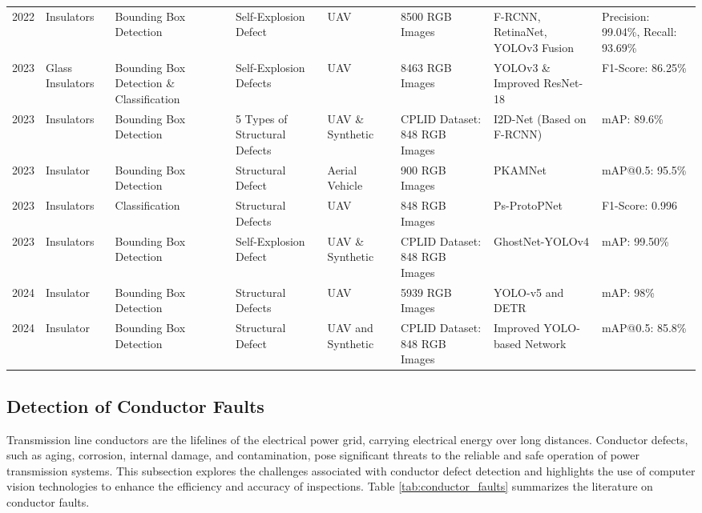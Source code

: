 {\begin{longtable}{P{.05} P{.1} P{.1} P{.1} P{.1} P{.15} P{.1} P{.1}}
2022 \cite{wei_online_2022} & Insulators & Bounding Box Detection & Self-Explosion Defect & UAV & 8500 RGB Images & F-RCNN, RetinaNet, YOLOv3 Fusion & Precision: 99.04\%, Recall: 93.69\% \\

2023 \cite{cao_accurate_2023} & Glass Insulators & Bounding Box Detection \& Classification & Self-Explosion Defects & UAV & 8463 RGB Images & YOLOv3 \& Improved ResNet-18 & F1-Score: 86.25\% \\

2023 \cite{fu_small_sized_2023} & Insulators & Bounding Box Detection & 5 Types of Structural Defects & UAV \& Synthetic & CPLID Dataset: 848 RGB Images & I2D-Net (Based on F-RCNN) & mAP: 89.6\% \\

2023 \cite{hao2023pkamnet} & Insulator & Bounding Box Detection & Structural Defect & Aerial Vehicle & 900 RGB Images & PKAMNet & mAP@0.5: 95.5\% \\

2023 \cite{singh_2023_interpretable} & Insulators & Classification & Structural Defects & UAV & 848 RGB Images & Ps-ProtoPNet & F1-Score: 0.996 \\

2023 \cite{zhang_multi_objects_2023} & Insulators & Bounding Box Detection & Self-Explosion Defect & UAV \& Synthetic & CPLID Dataset: 848 RGB Images & GhostNet-YOLOv4 & mAP: 99.50\% \\

2024 \cite{jain2024transfer} & Insulator & Bounding Box Detection & Structural Defects & UAV & 5939 RGB Images & YOLO-v5 and DETR & mAP: 98\% \\

2024 \cite{wang2024mci} & Insulator & Bounding Box Detection & Structural Defect & UAV and Synthetic & CPLID Dataset: 848 RGB Images & Improved YOLO-based Network & mAP@0.5: 85.8\% \\
\hline

\end{longtable}
}

\subsection{Detection of Conductor Faults}
Transmission line conductors are the lifelines of the electrical power grid, carrying electrical energy over long distances. Conductor defects, such as aging, corrosion, internal damage, and contamination, pose significant threats to the reliable and safe operation of power transmission systems. This subsection explores the challenges associated with conductor defect detection and highlights the use of computer vision technologies to enhance the efficiency and accuracy of inspections. Table \ref{tab:conductor_faults} summarizes the literature on conductor faults.

